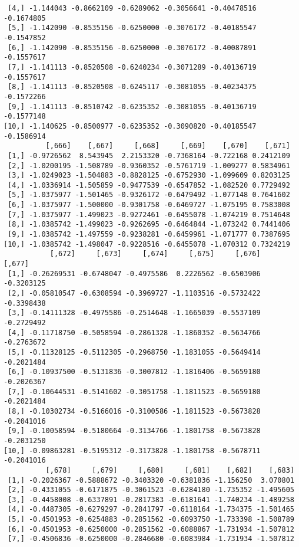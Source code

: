 \documentclass[
  letterpaper,
  DIV=11,
  numbers=noendperiod]{scrreprt}
\begin{document}
\begin{verbatim}
 [4,] -1.144043 -0.8662109 -0.6289062 -0.3056641 -0.40478516 -0.1674805
 [5,] -1.142090 -0.8535156 -0.6250000 -0.3076172 -0.40185547 -0.1547852
 [6,] -1.142090 -0.8535156 -0.6250000 -0.3076172 -0.40087891 -0.1557617
 [7,] -1.141113 -0.8520508 -0.6240234 -0.3071289 -0.40136719 -0.1557617
 [8,] -1.141113 -0.8520508 -0.6245117 -0.3081055 -0.40234375 -0.1572266
 [9,] -1.141113 -0.8510742 -0.6235352 -0.3081055 -0.40136719 -0.1577148
[10,] -1.140625 -0.8500977 -0.6235352 -0.3090820 -0.40185547 -0.1586914
          [,666]    [,667]     [,668]     [,669]    [,670]    [,671]
 [1,] -0.9726562  8.543945  2.2153320 -0.7368164 -0.722168 0.2412109
 [2,] -1.0200195 -1.508789 -0.9360352 -0.5761719 -1.009277 0.5834961
 [3,] -1.0249023 -1.504883 -0.8828125 -0.6752930 -1.099609 0.8203125
 [4,] -1.0336914 -1.505859 -0.9477539 -0.6547852 -1.082520 0.7729492
 [5,] -1.0375977 -1.501465 -0.9326172 -0.6479492 -1.077148 0.7641602
 [6,] -1.0375977 -1.500000 -0.9301758 -0.6469727 -1.075195 0.7583008
 [7,] -1.0375977 -1.499023 -0.9272461 -0.6455078 -1.074219 0.7514648
 [8,] -1.0385742 -1.499023 -0.9262695 -0.6464844 -1.073242 0.7441406
 [9,] -1.0385742 -1.497559 -0.9238281 -0.6459961 -1.071777 0.7387695
[10,] -1.0385742 -1.498047 -0.9228516 -0.6455078 -1.070312 0.7324219
           [,672]     [,673]     [,674]     [,675]     [,676]     [,677]
 [1,] -0.26269531 -0.6748047 -0.4975586  0.2226562 -0.6503906 -0.3203125
 [2,] -0.05810547 -0.6308594 -0.3969727 -1.1103516 -0.5732422 -0.3398438
 [3,] -0.14111328 -0.4975586 -0.2514648 -1.1665039 -0.5537109 -0.2729492
 [4,] -0.11718750 -0.5058594 -0.2861328 -1.1860352 -0.5634766 -0.2763672
 [5,] -0.11328125 -0.5112305 -0.2968750 -1.1831055 -0.5649414 -0.2021484
 [6,] -0.10937500 -0.5131836 -0.3007812 -1.1816406 -0.5659180 -0.2026367
 [7,] -0.10644531 -0.5141602 -0.3051758 -1.1811523 -0.5659180 -0.2021484
 [8,] -0.10302734 -0.5166016 -0.3100586 -1.1811523 -0.5673828 -0.2041016
 [9,] -0.10058594 -0.5180664 -0.3134766 -1.1801758 -0.5673828 -0.2031250
[10,] -0.09863281 -0.5195312 -0.3173828 -1.1801758 -0.5678711 -0.2041016
          [,678]     [,679]     [,680]     [,681]    [,682]    [,683]
 [1,] -0.2026367 -0.5888672 -0.3403320 -0.6381836 -1.156250  3.070801
 [2,] -0.4331055 -0.6171875 -0.3061523 -0.6284180 -1.735352 -1.495605
 [3,] -0.4458008 -0.6337891 -0.2817383 -0.6181641 -1.740234 -1.489258
 [4,] -0.4487305 -0.6279297 -0.2841797 -0.6118164 -1.734375 -1.501465
 [5,] -0.4501953 -0.6254883 -0.2851562 -0.6093750 -1.733398 -1.508789
 [6,] -0.4501953 -0.6250000 -0.2851562 -0.6088867 -1.731934 -1.507812
 [7,] -0.4506836 -0.6250000 -0.2846680 -0.6083984 -1.731934 -1.507812

\end{verbatim}
\end{document}
